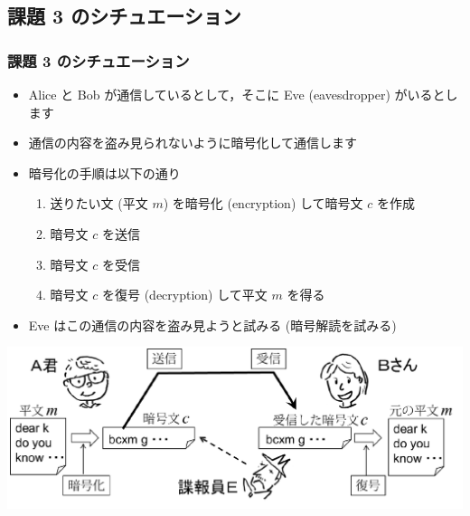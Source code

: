 \subsection{課題 3 のシチュエーション}
\begin{frame}[containsverbatim,label=situation,shrink]
\frametitle{課題 3 のシチュエーション}
  \begin{itemize}
\item Alice と Bob が通信しているとして，そこに Eve (eavesdropper) がいるとします
\item 通信の内容を盗み見られないように暗号化して通信します
\item 暗号化の手順は以下の通り
    \begin{enumerate}
\item 送りたい文 (平文 $m$) を暗号化 (encryption) して暗号文 $c$ を作成
\item 暗号文 $c$ を送信
\item 暗号文 $c$ を受信
\item 暗号文 $c$ を復号 (decryption) して平文 $m$ を得る
    \end{enumerate}
\item Eve はこの通信の内容を盗み見ようと試みる (暗号解読を試みる)
  \end{itemize}
  \begin{center}
\includegraphics[scale=0.3]{./Figure/elementaryCS-figAliceBob.pdf}
  \end{center}
\hfill{\hyperlink{function}{}}
\end{frame}
